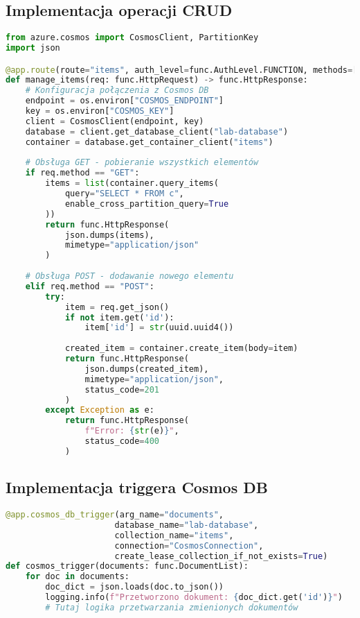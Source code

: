 \documentclass{article}
\begin{document}
\subsection{Implementacja operacji CRUD}
\begin{lstlisting}[language=python]
from azure.cosmos import CosmosClient, PartitionKey
import json

@app.route(route="items", auth_level=func.AuthLevel.FUNCTION, methods=["GET", "POST"])
def manage_items(req: func.HttpRequest) -> func.HttpResponse:
    # Konfiguracja połączenia z Cosmos DB
    endpoint = os.environ["COSMOS_ENDPOINT"]
    key = os.environ["COSMOS_KEY"]
    client = CosmosClient(endpoint, key)
    database = client.get_database_client("lab-database")
    container = database.get_container_client("items")
    
    # Obsługa GET - pobieranie wszystkich elementów
    if req.method == "GET":
        items = list(container.query_items(
            query="SELECT * FROM c",
            enable_cross_partition_query=True
        ))
        return func.HttpResponse(
            json.dumps(items),
            mimetype="application/json"
        )
    
    # Obsługa POST - dodawanie nowego elementu
    elif req.method == "POST":
        try:
            item = req.get_json()
            if not item.get('id'):
                item['id'] = str(uuid.uuid4())
            
            created_item = container.create_item(body=item)
            return func.HttpResponse(
                json.dumps(created_item),
                mimetype="application/json",
                status_code=201
            )
        except Exception as e:
            return func.HttpResponse(
                f"Error: {str(e)}",
                status_code=400
            )
\end{lstlisting}

\subsection{Implementacja triggera Cosmos DB}
\begin{lstlisting}[language=python]
@app.cosmos_db_trigger(arg_name="documents", 
                      database_name="lab-database",
                      collection_name="items",
                      connection="CosmosConnection",
                      create_lease_collection_if_not_exists=True)
def cosmos_trigger(documents: func.DocumentList):
    for doc in documents:
        doc_dict = json.loads(doc.to_json())
        logging.info(f"Przetworzono dokument: {doc_dict.get('id')}")
        # Tutaj logika przetwarzania zmienionych dokumentów
\end{lstlisting}
\end{document}
